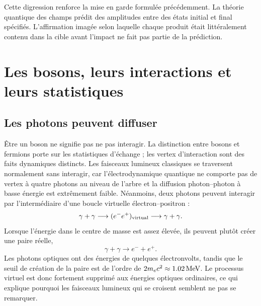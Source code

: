 \begin{classroomqa}
\end{classroomqa}

Cette digression renforce la mise en garde formulée précédemment. La théorie quantique des champs prédit des amplitudes entre des états initial et final spécifiés. L’affirmation imagée selon laquelle chaque produit était littéralement contenu dans la cible avant l’impact ne fait pas partie de la prédiction.

\section{Les bosons, leurs interactions et leurs statistiques}

\subsection{Les photons peuvent diffuser}

Être un boson ne signifie pas ne pas interagir. La distinction entre bosons et fermions porte sur les statistiques d’échange ; les vertex d’interaction sont des faits dynamiques distincts. Les faisceaux lumineux classiques se traversent normalement sans interagir, car l’électrodynamique quantique ne comporte pas de vertex à quatre photons au niveau de l’arbre et la diffusion photon--photon à basse énergie est extrêmement faible. Néanmoins, deux photons peuvent interagir par l’intermédiaire d’une boucle virtuelle électron--positron :
\begin{equation}
  \gamma+\gamma
  \longrightarrow(e^-e^+)_{\rm virtual}
  \longrightarrow\gamma+\gamma.
\end{equation}
Lorsque l’énergie dans le centre de masse est assez élevée, ils peuvent plutôt créer une paire réelle,
\begin{equation}
  \gamma+\gamma\longrightarrow e^-+e^+.
\end{equation}
Les photons optiques ont des énergies de quelques électronvolts, tandis que le seuil de création de la paire est de l’ordre de \(2m_e c^2\approx1.02\,{\rm MeV}\). Le processus virtuel est donc fortement supprimé aux énergies optiques ordinaires, ce qui explique pourquoi les faisceaux lumineux qui se croisent semblent ne pas se remarquer.

